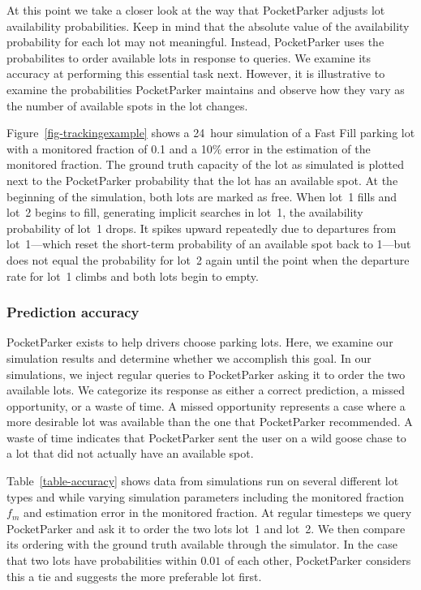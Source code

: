 At this point we take a closer look at the way that PocketParker adjusts lot
availability probabilities. Keep in mind that the absolute value of the
availability probability for each lot may not meaningful. Instead,
PocketParker uses the probabilites to order available lots in response to
queries. We examine its accuracy at performing this essential task next.
However, it is illustrative to examine the probabilities PocketParker
maintains and observe how they vary as the number of available spots in the
lot changes.

Figure~\ref{fig-trackingexample} shows a 24~hour simulation of a Fast Fill
parking lot with a monitored fraction of 0.1 and a 10\% error in the
estimation of the monitored fraction. The ground truth capacity of the lot as
simulated is plotted next to the PocketParker probability that the lot has an
available spot. At the beginning of the simulation, both lots are marked as
free. When lot~1 fills and lot~2 begins to fill, generating implicit searches
in lot~1, the availability probability of lot~1 drops. It spikes upward
repeatedly due to departures from lot~1---which reset the short-term
probability of an available spot back to 1---but does not equal the
probability for lot~2 again until the point when the departure rate for lot~1
climbs and both lots begin to empty.

\subsubsection{Prediction accuracy}



PocketParker exists to help drivers choose parking lots. Here, we examine our
simulation results and determine whether we accomplish this goal. In our
simulations, we inject regular queries to PocketParker asking it to order the
two available lots. We categorize its response as either a correct
prediction, a missed opportunity, or a waste of time. A missed opportunity
represents a case where a more desirable lot was available than the one that
PocketParker recommended. A waste of time indicates that PocketParker sent
the user on a wild goose chase to a lot that did not actually have an
available spot.

Table~\ref{table-accuracy} shows data from simulations run on several
different lot types and while varying simulation parameters including the
monitored fraction $f_m$ and estimation error in the monitored fraction. At
regular timesteps we query PocketParker and ask it to order the two lots
lot~1 and lot~2. We then compare its ordering with the ground truth available
through the simulator. In the case that two lots have probabilities within
$0.01$ of each other, PocketParker considers this a tie and suggests the more
preferable lot first.

